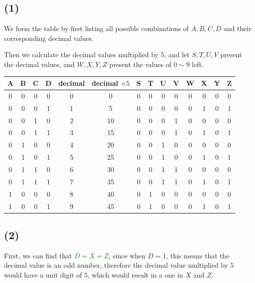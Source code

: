 \documentclass{article}
\begin{document}
\subsection*{(1)}

We form the table by first listing all possible combinations of $A, B, C, D$ and their corresponding decimal values.   
\bigskip

Then we calculate the decimal values multiplied by 5, 
and let $S, T, U, V$ present the decimal values, and $W, X, Y, Z$ present the values of $0 \sim 9$ left.

\begin{center}
    \begin{tabular}{ |c|c|c|c||c|c||c|c|c|c||c|c|c|c| } 
        \hline
        \cline{1-5}\cline{6-9}\cline{10-14}
        A & B & C & D & decimal & decimal $\times 5$ & S & T & U & V & W & X & Y & Z\\ 
        \hline
        0 & 0 & 0 & 0 & 0 & 0 & 0 & 0 & 0 & 0 & 0 & 0 & 0 & 0 \\ 
        0 & 0 & 0 & 1 & 1 & 5 & 0 & 0 & 0 & 0 & 0 & 1 & 0 & 1 \\ 
        0 & 0 & 1 & 0 & 2 & 10 & 0 & 0 & 0 & 1 & 0 & 0 & 0 & 0 \\ 
        0 & 0 & 1 & 1 & 3 & 15 & 0 & 0 & 0 & 1 & 0 & 1 & 0 & 1 \\ 
        0 & 1 & 0 & 0 & 4 & 20 & 0 & 0 & 1 & 0 & 0 & 0 & 0 & 0 \\ 
        0 & 1 & 0 & 1 & 5 & 25 & 0 & 0 & 1 & 0 & 0 & 1 & 0 & 1 \\ 
        0 & 1 & 1 & 0 & 6 & 30 & 0 & 0 & 1 & 1 & 0 & 0 & 0 & 0 \\ 
        0 & 1 & 1 & 1 & 7 & 35 & 0 & 0 & 1 & 1 & 0 & 1 & 0 & 1 \\ 
        1 & 0 & 0 & 0 & 8 & 40 & 0 & 1 & 0 & 0 & 0 & 0 & 0 & 0 \\
        1 & 0 & 0 & 1 & 9 & 45 & 0 & 1 & 0 & 0 & 0 & 1 & 0 & 1 \\ 
        \hline
    \end{tabular}
\end{center}

\subsection*{(2)}

First, we can find that \textcolor{Green}{$D = X = Z$}, since when $D = 1$, this means that the decimal value is an odd number, 
therefore the decimal value multiplied by $5$ would have a unit digit of $5$, which would result in a one in $X$ and $Z$.
\end{document}
